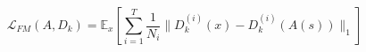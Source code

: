 $$
\mathcal{L}_{FM}\left( A, D_k\right) =
\mathbb{E}_x\left[\sum_{i=1}^T \frac{1}{N_i}
\lVert D_k^{(i)}(x) - D_k^{(i)}(A(s))\rVert_1
\right]
$$
